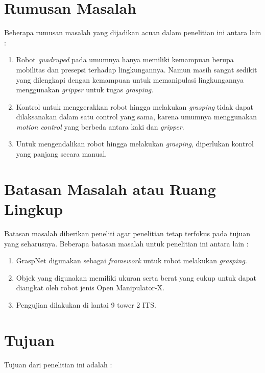 \section{Rumusan Masalah}

Beberapa rumusan masalah yang dijadikan acuan dalam penelitian ini antara lain :

\begin{enumerate}
    \item Robot \emph{quadruped} pada umumnya hanya memiliki kemampuan berupa mobilitas
    dan presepsi terhadap lingkungannya. Namun masih sangat sedikit yang dilengkapi
    dengan kemampuan untuk memanipulasi lingkungannya menggunakan \emph{gripper} untuk tugas \emph{grasping}.
    \item Kontrol untuk menggerakkan robot hingga melakukan \emph{grasping} tidak dapat dilaksanakan dalam
    satu control yang sama, karena umumnya menggunakan \emph{motion control} yang berbeda antara kaki dan \emph{gripper}.
    \item Untuk mengendalikan robot hingga melakukan \emph{grasping}, diperlukan kontrol yang panjang secara manual.

\end{enumerate}

\section{Batasan Masalah atau Ruang Lingkup}

Batasan masalah diberikan peneliti agar penelitian tetap terfokus pada tujuan yang seharusnya. Beberapa batasan masalah untuk penelitian ini antara lain :

\begin{enumerate}
    \item GraspNet digunakan sebagai \emph{framework} untuk robot melakukan \emph{grasping}.
    \item Objek yang digunakan memiliki ukuran serta berat yang cukup untuk dapat diangkat oleh robot jenis Open Manipulator-X.
    \item Pengujian dilakukan di lantai 9 tower 2 ITS.
\end{enumerate}

\section{Tujuan}

Tujuan dari penelitian ini adalah :

